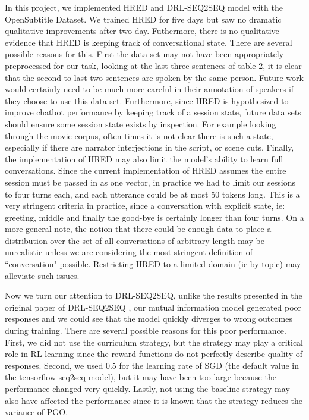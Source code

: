 In this project, we implemented HRED and DRL-SEQ2SEQ model with the OpenSubtitle Dataset. We trained HRED for five days but saw no dramatic qualitative improvements after two day. Futhermore, there is no qualitative evidence that HRED is keeping track of conversational state. There are several possible reasons for this. First the data set may not have been appropriately preprocessed for our task, looking at the last three sentences of table 2, it is clear that the second to last two sentences are spoken by the same person. Future work would certainly need to be much more careful in their annotation of speakers if they choose to use this data set. Furthermore, since HRED is hypothesized to improve chatbot performance by keeping track of a session state, future data sets should ensure some session state exists by inspection. For example looking through the movie corpus, often times it is not clear there is such a state, especially if there are narrator interjections in the script, or scene cuts. Finally, the implementation of HRED may also limit the model's ability to learn full conversations. Since the current implementation of HRED assumes the entire session must be passed in as one vector, in practice we had to limit our sessions to four turns each, and each utterance could be at most 50 tokens long. This is a very stringent criteria in practice, since a conversation with explicit state, ie: greeting, middle and finally the good-bye is certainly longer than four turns. On a more general note, the notion that there could be enough data to place a distribution over the set of all conversations of arbitrary length may be unrealistic unless we are considering the most stringent definition of ``conversation" possible. Restricting HRED to a limited domain (ie by topic) may alleviate such issues. 

Now we turn our attention to DRL-SEQ2SEQ, unlike the results presented in the original paper of DRL-SEQ2SEQ \cite{Li}, our mutual information model generated poor responses and we could see that the model quickly diverges to wrong outcomes during training. There are several possible reasons for this poor performance. First, we did not use the curriculum strategy, but the strategy may play a critical role in RL learning since the reward functions do not perfectly describe quality of responses. Second, we used 0.5 for the learning rate of SGD (the default value in the tensorflow seq2seq model), but it may have been too large because the performance changed very quickly. Lastly, not using the baseline strategy may also have affected the performance since it is known that the strategy reduces the variance of PGO. 